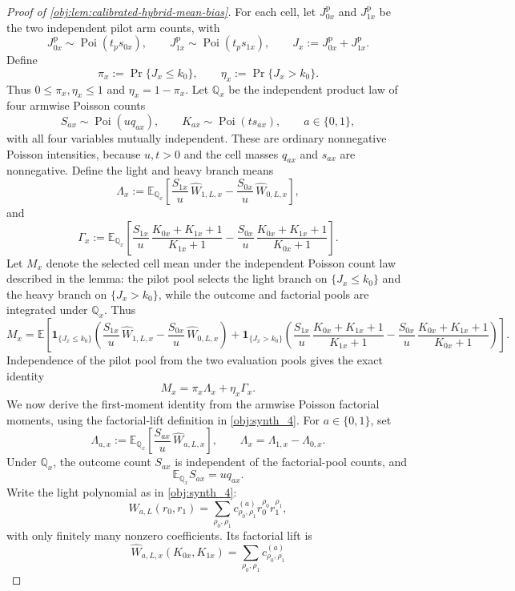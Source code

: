 \documentclass[11pt]{article}
\begin{document}
\begin{proof}[Proof of \cref{obj:lem:calibrated-hybrid-mean-bias}]
For each cell, let \(J_{0x}^{\mathrm p}\) and \(J_{1x}^{\mathrm p}\) be the two independent pilot arm counts, with
\[
J_{0x}^{\mathrm p}\sim\operatorname{Poi}(t_p s_{0x}),
\qquad
J_{1x}^{\mathrm p}\sim\operatorname{Poi}(t_p s_{1x}),
\qquad
J_x:=J_{0x}^{\mathrm p}+J_{1x}^{\mathrm p}.
\]
Define
\[
\pi_x
:=
\Pr\{J_x\le k_0\},
\qquad
\eta_x
:=
\Pr\{J_x>k_0\}.
\]
Thus \(0\le\pi_x,\eta_x\le1\) and \(\eta_x=1-\pi_x\).  Let \(\mathbb Q_x\) be the independent product law of four armwise Poisson counts
\[
S_{ax}\sim\operatorname{Poi}(u q_{ax}),
\qquad
K_{ax}\sim\operatorname{Poi}(t s_{ax}),
\qquad a\in\{0,1\},
\]
with all four variables mutually independent.  These are ordinary nonnegative Poisson intensities, because \(u,t>0\) and the cell masses \(q_{ax}\) and \(s_{ax}\) are nonnegative.  Define the light and heavy branch means
\[
\Lambda_x
:=
\mathbb E_{\mathbb Q_x}\!\left[
\frac{S_{1x}}u\,\widehat W_{1,L,x}
-
\frac{S_{0x}}u\,\widehat W_{0,L,x}
\right],
\]
and
\[
\Gamma_x
:=
\mathbb E_{\mathbb Q_x}\!\left[
\frac{S_{1x}}u\,\frac{K_{0x}+K_{1x}+1}{K_{1x}+1}
-
\frac{S_{0x}}u\,\frac{K_{0x}+K_{1x}+1}{K_{0x}+1}
\right].
\]
Let \(M_x\) denote the selected cell mean under the independent Poisson count law described in the lemma: the pilot pool selects the light branch on \(\{J_x\le k_0\}\) and the heavy branch on \(\{J_x>k_0\}\), while the outcome and factorial pools are integrated under \(\mathbb Q_x\).  Thus
\[
M_x
=
\mathbb E\!\left[
\mathbf 1_{\{J_x\le k_0\}}\left(
\frac{S_{1x}}u\,\widehat W_{1,L,x}
-
\frac{S_{0x}}u\,\widehat W_{0,L,x}\right)
+
\mathbf 1_{\{J_x>k_0\}}\left(
\frac{S_{1x}}u\,\frac{K_{0x}+K_{1x}+1}{K_{1x}+1}
-
\frac{S_{0x}}u\,\frac{K_{0x}+K_{1x}+1}{K_{0x}+1}\right)
\right].
\]
Independence of the pilot pool from the two evaluation pools gives the exact identity
\[
M_x=\pi_x\Lambda_x+\eta_x\Gamma_x .
\]
We now derive the first-moment identity from the armwise Poisson factorial moments, using the factorial-lift definition in \cref{obj:synth_4}.  For \(a\in\{0,1\}\), set
\[
\Lambda_{a,x}
:=
\mathbb E_{\mathbb Q_x}\!\left[
\frac{S_{ax}}u\,\widehat W_{a,L,x}
\right],
\qquad
\Lambda_x=\Lambda_{1,x}-\Lambda_{0,x}.
\]
Under \(\mathbb Q_x\), the outcome count \(S_{ax}\) is independent of the factorial-pool counts, and
\[
\mathbb E_{\mathbb Q_x}S_{ax}=u q_{ax}.
\]
Write the light polynomial as in \cref{obj:synth_4}:
\[
W_{a,L}(r_0,r_1)=\sum_{\rho_0,\rho_1}
 c^{(a)}_{\rho_0,\rho_1}r_0^{\rho_0}r_1^{\rho_1},
\]
with only finitely many nonzero coefficients.  Its factorial lift is
\[
\widehat W_{a,L,x}(K_{0x},K_{1x})
=
\sum_{\rho_0,\rho_1}c^{(a)}_{\rho_0,\rho_1}
\]
\end{proof}
\end{document}
